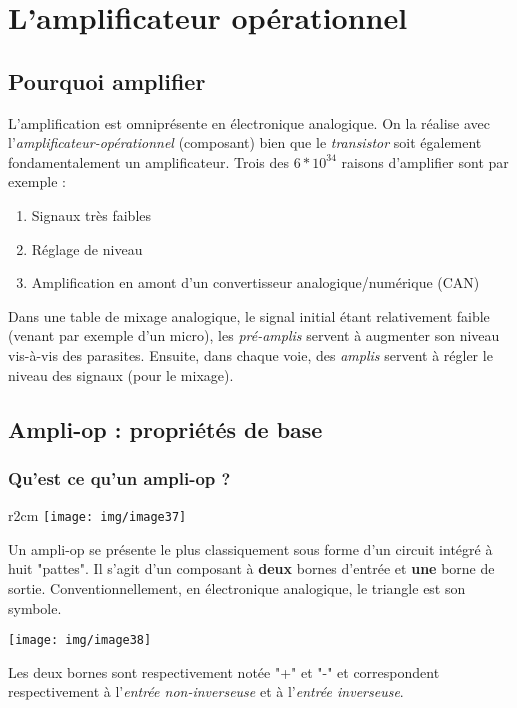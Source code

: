 \chapter{L'amplificateur opérationnel}
\setcounter{section}{-1}
\section{Pourquoi amplifier}
L'amplification est omniprésente en électronique analogique. On la réalise avec l'\textit{amplificateur-opérationnel} (composant) bien que le \textit{transistor} soit également fondamentalement un amplificateur. Trois des $6*10^{34}$ raisons d'amplifier sont par exemple : 
\begin{enumerate}
	\item Signaux très faibles
	\item Réglage de niveau
	\item Amplification en amont d'un convertisseur analogique/numérique (CAN)
\end{enumerate}

Dans une table de mixage analogique, le signal initial étant relativement faible (venant par exemple d'un micro), les \textit{pré-amplis} servent à augmenter son niveau vis-à-vis des parasites. Ensuite, dans chaque voie, des \textit{amplis} servent à régler le niveau des signaux (pour le mixage).



\section{Ampli-op : propriétés de base}
\subsection{Qu'est ce qu'un ampli-op ?}
\begin{wrapfigure}[5]{r}{2cm}
	\texttt{[image: img/image37]}
\end{wrapfigure}

Un ampli-op se présente le plus classiquement sous forme d'un circuit intégré à huit "pattes". Il s'agit d'un composant à \textbf{deux} bornes d'entrée et \textbf{une} borne de sortie. Conventionnellement, en électronique analogique, le triangle est son symbole.
\begin{center}
	\texttt{[image: img/image38]}
\end{center}
Les deux bornes sont respectivement notée "+" et "-" et correspondent respectivement à l'\textit{entrée non-inverseuse} et à l'\textit{entrée inverseuse}.

